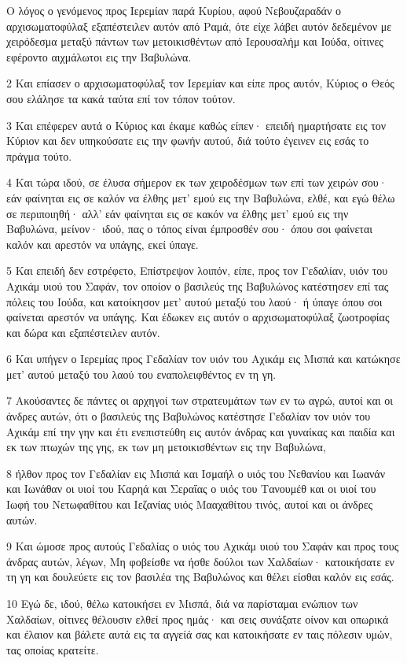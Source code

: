 \par Ο λόγος ο γενόμενος προς Ιερεμίαν παρά Κυρίου, αφού Νεβουζαραδάν ο αρχισωματοφύλαξ εξαπέστειλεν αυτόν από Ραμά, ότε είχε λάβει αυτόν δεδεμένον με χειρόδεσμα μεταξύ πάντων των μετοικισθέντων από Ιερουσαλήμ και Ιούδα, οίτινες εφέροντο αιχμάλωτοι εις την Βαβυλώνα.
\par 2 Και επίασεν ο αρχισωματοφύλαξ τον Ιερεμίαν και είπε προς αυτόν, Κύριος ο Θεός σου ελάλησε τα κακά ταύτα επί τον τόπον τούτον.
\par 3 Και επέφερεν αυτά ο Κύριος και έκαμε καθώς είπεν· επειδή ημαρτήσατε εις τον Κύριον και δεν υπηκούσατε εις την φωνήν αυτού, διά τούτο έγεινεν εις εσάς το πράγμα τούτο.
\par 4 Και τώρα ιδού, σε έλυσα σήμερον εκ των χειροδέσμων των επί των χειρών σου· εάν φαίνηται εις σε καλόν να έλθης μετ' εμού εις την Βαβυλώνα, ελθέ, και εγώ θέλω σε περιποιηθή· αλλ' εάν φαίνηται εις σε κακόν να έλθης μετ' εμού εις την Βαβυλώνα, μείνον· ιδού, πας ο τόπος είναι έμπροσθέν σου· όπου σοι φαίνεται καλόν και αρεστόν να υπάγης, εκεί ύπαγε.
\par 5 Και επειδή δεν εστρέφετο, Επίστρεψον λοιπόν, είπε, προς τον Γεδαλίαν, υιόν του Αχικάμ υιού του Σαφάν, τον οποίον ο βασιλεύς της Βαβυλώνος κατέστησεν επί τας πόλεις του Ιούδα, και κατοίκησον μετ' αυτού μεταξύ του λαού· ή ύπαγε όπου σοι φαίνεται αρεστόν να υπάγης. Και έδωκεν εις αυτόν ο αρχισωματοφύλαξ ζωοτροφίας και δώρα και εξαπέστειλεν αυτόν.
\par 6 Και υπήγεν ο Ιερεμίας προς Γεδαλίαν τον υιόν του Αχικάμ εις Μισπά και κατώκησε μετ' αυτού μεταξύ του λαού του εναπολειφθέντος εν τη γη.
\par 7 Ακούσαντες δε πάντες οι αρχηγοί των στρατευμάτων των εν τω αγρώ, αυτοί και οι άνδρες αυτών, ότι ο βασιλεύς της Βαβυλώνος κατέστησε Γεδαλίαν τον υιόν του Αχικάμ επί την γην και έτι ενεπιστεύθη εις αυτόν άνδρας και γυναίκας και παιδία και εκ των πτωχών της γης, εκ των μη μετοικισθέντων εις την Βαβυλώνα,
\par 8 ήλθον προς τον Γεδαλίαν εις Μισπά και Ισμαήλ ο υιός του Νεθανίου και Ιωανάν και Ιωνάθαν οι υιοί του Καρηά και Σεραΐας ο υιός του Τανουμέθ και οι υιοί του Ιωφή του Νετωφαθίτου και Ιεζανίας υιός Μααχαθίτου τινός, αυτοί και οι άνδρες αυτών.
\par 9 Και ώμοσε προς αυτούς Γεδαλίας ο υιός του Αχικάμ υιού του Σαφάν και προς τους άνδρας αυτών, λέγων, Μη φοβείσθε να ήσθε δούλοι των Χαλδαίων· κατοικήσατε εν τη γη και δουλεύετε εις τον βασιλέα της Βαβυλώνος και θέλει είσθαι καλόν εις εσάς.
\par 10 Εγώ δε, ιδού, θέλω κατοικήσει εν Μισπά, διά να παρίσταμαι ενώπιον των Χαλδαίων, οίτινες θέλουσιν ελθεί προς ημάς· και σεις συνάξατε οίνον και οπωρικά και έλαιον και βάλετε αυτά εις τα αγγείά σας και κατοικήσατε εν ταις πόλεσιν υμών, τας οποίας κρατείτε.
